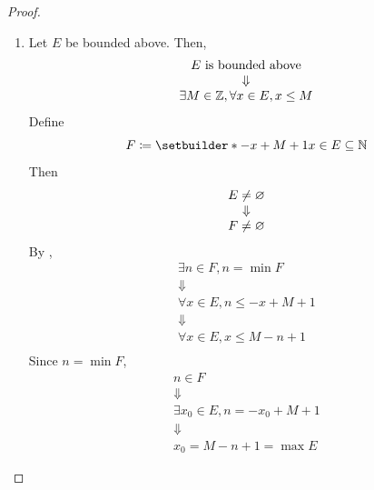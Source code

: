 \begin{proof}
\begin{enumerate}[label=\textbf{(\Alph*)}]
\[\begin{array}{c}
            x_{0} = n + m - 1 = \min E
        \end{array}
        \]
        \item Let $E$ be bounded above. Then,
        \[
        \begin{array}{c}
            E \text{ is bounded above} \\
            \Downarrow \\
            \exists M \in \mathbb{Z}, \forall x \in E, x \leq M
        \end{array}
        \]
        Define
        \[
        F \coloneqq \setbuilder*{-x + M + 1}{x \in E} \subseteq \N
        \]
        Then
        \[
        \begin{array}{c}
            E \neq \varnothing \\
            \Downarrow \\
            F \neq \varnothing
        \end{array}
        \]
        By ,
        \[
        \begin{array}{c}
            \exists n \in F, n = \min F \\
            \Downarrow \\
            \forall x \in E, n \leq - x + M + 1 \\
            \Downarrow \\
            \forall x \in E, x \leq M - n + 1 \\
        \end{array}
        \]
        Since $n = \min F$,
        \[
        \begin{array}{c}
            n \in F \\
            \Downarrow \\
            \exists x_{0} \in E, n = -x_{0} + M + 1 \\
            \Downarrow \\
            x_{0} = M - n + 1 = \max E
        \end{array}
        \]
    \end{enumerate}
\end{proof}

\bigskip

